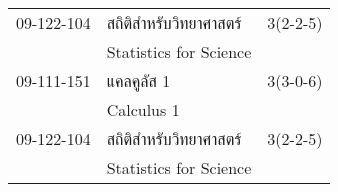 \begin{longtable}{p{}p{}r{}}
09-122-104 & สถิติสำหรับวิทยาศาสตร์ & 3(2-2-5)\\
 & Statistics for Science & \\[1mm]
09-111-151 & แคลคูลัส 1 & 3(3-0-6)\\
 & Calculus 1 & \\[1mm]
09-122-104 & สถิติสำหรับวิทยาศาสตร์ & 3(2-2-5)\\
 & Statistics for Science & \\[1mm]
\end{longtable}
